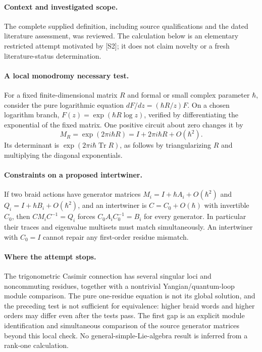 \documentclass[11pt]{article}
\begin{document}
\paragraph{Context and investigated scope.} The complete supplied definition, including source qualifications and the dated literature assessment, was reviewed. The calculation below is an elementary restricted attempt motivated by [S2]; it does not claim novelty or a fresh literature-status determination.

\paragraph{A local monodromy necessary test.} For a fixed finite-dimensional matrix $R$ and formal or small complex parameter $\hbar$, consider the pure logarithmic equation $dF/dz=(\hbar R/z)F$. On a chosen logarithm branch, $F(z)=\exp(\hbar R\log z)$, verified by differentiating the exponential of the fixed matrix. One positive circuit about zero changes it by
\[
 M_R=\exp(2\pi i\hbar R)=I+2\pi i\hbar R+O(\hbar^2).
\]
Its determinant is $\exp(2\pi i\hbar\operatorname{Tr}R)$, as follows by triangularizing $R$ and multiplying the diagonal exponentials.

\paragraph{Constraints on a proposed intertwiner.} If two braid actions have generator matrices $M_i=I+\hbar A_i+O(\hbar^2)$ and $Q_i=I+\hbar B_i+O(\hbar^2)$, and an intertwiner is $C=C_0+O(\hbar)$ with invertible $C_0$, then $CM_iC^{-1}=Q_i$ forces $C_0A_iC_0^{-1}=B_i$ for every generator. In particular their traces and eigenvalue multisets must match simultaneously. An intertwiner with $C_0=I$ cannot repair any first-order residue mismatch.

\paragraph{Where the attempt stops.} The trigonometric Casimir connection has several singular loci and noncommuting residues, together with a nontrivial Yangian/quantum-loop module comparison. The pure one-residue equation is not its global solution, and the preceding test is not sufficient for equivalence: higher braid words and higher orders may differ even after the tests pass. The first gap is an explicit module identification and simultaneous comparison of the source generator matrices beyond this local check. No general-simple-Lie-algebra result is inferred from a rank-one calculation.
\end{document}
